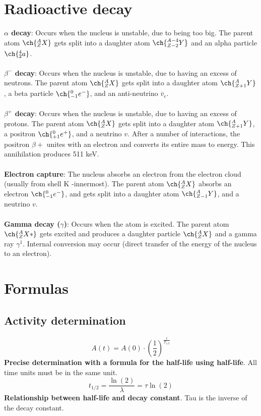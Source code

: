 \chapter{Radioactive decay}
\textbf{$\alpha$ decay}: Occurs when the nucleus is unstable, due to being too big. The parent atom $\ch{^{A}_{Z}X}$ gets split into a daughter atom $\ch{^{A-4}_{Z-2}Y}$ and an alpha particle $\ch{^{4}_{2}a}$.\\\\
\textbf{$\beta^{-}$ decay}: Occurs when the nucleus is unstable, due to having an excess of neutrons. The parent atom $\ch{^{A}_{Z}X}$ gets split into a daughter atom $\ch{^{A}_{Z+1}Y}$, a beta particle $\ch{^{0}_{-1}e^{-}}$, and an anti-neutrino $\overline{v}_e$.\\\\
\textbf{$\beta^{+}$ decay}: Occurs when the nucleus is unstable, due to having an excess of protons. The parent atom $\ch{^{A}_{Z}X}$ gets split into a daughter atom $\ch{^{A}_{Z+1}Y}$, a positron $\ch{^{0}_{+1}e^{+}}$, and a neutrino $v$. After a number of interactions, the positron $\beta{+}$ unites with an electron and converts its entire mass to energy. This annihilation produces 511 keV.\\\\
\textbf{Electron capture}: The nucleus absorbs an electron from the electron cloud (usually from shell K -innermost). The parent atom $\ch{^{A}_{Z}X}$ absorbs an electron $\ch{^{0}_{-1}e^{-}}$, and gets split into a daughter atom $\ch{^{A}_{Z-1}Y}$, and a neutrino $v$.\\\\
\textbf{Gamma decay ($\gamma$)}: Occurs when the atom is excited. The parent atom $\ch{^{A}_{Z}X*}$ gets excited and produces a daughter particle $\ch{^{A}_{Z}X}$ and a gamma ray $\gamma^{1}$. Internal conversion may occur (direct transfer of the energy of the nucleus to an electron).
\chapter{Formulas}
\section{Activity determination}
\[A(t) = A(0) \cdot (\frac{1}{2})^{\frac{t}{T_{1/2}}}\]
\textbf{Precise determination with a formula for the half-life using half-life}. All time units must be in the same unit.\\
\[t_{1/2} = \frac{\ln (2)}{\lambda} = \tau \ln (2)\]
\textbf{Relationship between half-life and decay constant}. Tau is the inverse of the decay constant.\\

